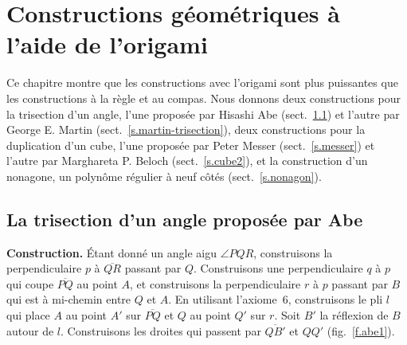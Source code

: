 
\chapter{Constructions géométriques à l'aide de l'origami}\label{c.origami-constructions}




Ce chapitre montre que les constructions avec l'origami sont plus puissantes que les constructions à la  règle et au compas. Nous donnons deux constructions pour la trisection d'un angle, l'une proposée par Hisashi Abe (sect.~\ref{s.abe-trisection}) et l'autre par George E. Martin (sect.~\ref{s.martin-trisection}), deux constructions pour la duplication d'un cube, l'une proposée par Peter Messer (sect.~\ref{s.messer}) et l'autre par Marghareta P. Beloch (sect.~\ref{s.cube2}), et la construction d'un nonagone, un polynôme régulier à neuf côtés (sect.~\ref{s.nonagon}).

\section{La trisection d'un angle proposée par Abe}\label{s.abe-trisection}


\noindent\textbf{Construction.}
Étant donné un angle aigu $\angle PQR$, construisons  la perpendiculaire  $p$ à $\overline{QR}$ passant par $Q$. Construisons  une perpendiculaire $q$ à $p$ qui coupe $\overline{PQ}$ au point $A$, et construisons  la perpendiculaire $r$ à $p$ passant par $B$ qui est à mi-chemin entre $Q$ et $A$. En utilisant l'axiome~6, construisons  le pli $l$ qui place $A$ au point $A'$ sur $\overline{PQ}$ et $Q$ au point $Q'$ sur $r$. Soit $B'$ la réflexion de $B$ autour de $l$. Construisons les droites qui passent par $\overline{QB'}$ et $QQ'$ (fig.~\ref{f.abe1}).

